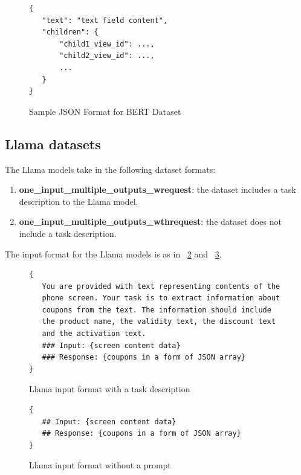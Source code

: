 \documentclass[licencjacka,en]{pracamgr}
\begin{document}
\begin{figure}[ht]
\centering
\begin{tcolorbox}[sharp corners, boxrule=0.5mm, colframe=black, colback=white, coltitle=black, width=0.9\textwidth]
\begin{BVerbatim}
{
   "text": "text field content",
   "children": {
       "child1_view_id": ...,
       "child2_view_id": ...,
       ...
   }
}
\end{BVerbatim}
\end{tcolorbox}
\caption{Sample JSON Format for BERT Dataset}
\label{fig:json_example_xml_tree}
\end{figure}

\subsection{Llama datasets}\label{llamaDsDesc}
The Llama models take in the following dataset formats:

\begin{enumerate}
    \item \textbf{one\_input\_multiple\_outputs\_wrequest}: the dataset includes a task description to the Llama model.
    \item \textbf{one\_input\_multiple\_outputs\_wthrequest}: the dataset does not include a task description.
\end{enumerate}

The input format for the Llama models is as in ~\ref{fig:llama_ds_w} and ~\ref{fig:llama_ds_wth}.

\begin{figure}[ht]
\centering
\begin{tcolorbox}[sharp corners, boxrule=0.5mm, colframe=black, colback=white, coltitle=black, width=0.9\textwidth]
\begin{BVerbatim}
{
   You are provided with text representing contents of the
   phone screen. Your task is to extract information about
   coupons from the text. The information should include
   the product name, the validity text, the discount text
   and the activation text.
   ### Input: {screen content data}
   ### Response: {coupons in a form of JSON array}
}
\end{BVerbatim}
\end{tcolorbox}
\caption{Llama input format with a task description}
\label{fig:llama_ds_w}
\end{figure}

\begin{figure}[ht]
\centering
\begin{tcolorbox}[sharp corners, boxrule=0.5mm, colframe=black, colback=white, coltitle=black, width=0.9\textwidth]
\begin{BVerbatim}
{
   ## Input: {screen content data}
   ## Response: {coupons in a form of JSON array}
}
\end{BVerbatim}
\end{tcolorbox}
\caption{Llama input format without a prompt}
\label{fig:llama_ds_wth}
\end{figure}
\end{document}
